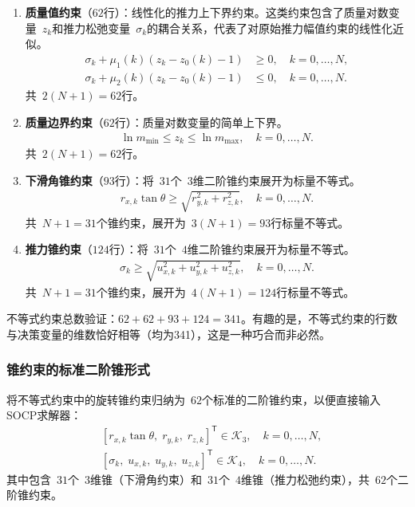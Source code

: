 \begin{enumerate}
  \item \textbf{质量值约束}（$62$行）：线性化的推力上下界约束。这类约束包含了质量对数变量~$z_k$和推力松弛变量~$\sigma_k$的耦合关系，代表了对原始推力幅值约束的线性化近似。
  \begin{align}
  \sigma_k + \mu_1(k)(z_k - z_0(k) - 1) &\ge 0,\quad k=0,\dots,N,\\
  \sigma_k + \mu_2(k)(z_k - z_0(k) - 1) &\le 0,\quad k=0,\dots,N.
  \end{align}
  共~$2(N+1)=62$行。

  \item \textbf{质量边界约束}（$62$行）：质量对数变量的简单上下界。
  \begin{align}
  \ln m_{\min} \le z_k \le \ln m_{\max},\quad k=0,\dots,N.
  \end{align}
  共~$2(N+1)=62$行。

  \item \textbf{下滑角锥约束}（$93$行）：将~$31$个~$3$维二阶锥约束展开为标量不等式。
  \begin{align}
  r_{x,k}\tan\theta \ge \sqrt{r_{y,k}^2 + r_{z,k}^2},\quad k=0,\dots,N.
  \end{align}
  共~$N+1=31$个锥约束，展开为~$3(N+1)=93$行标量不等式。

  \item \textbf{推力锥约束}（$124$行）：将~$31$个~$4$维二阶锥约束展开为标量不等式。
  \begin{align}
  \sigma_k \ge \sqrt{u_{x,k}^2 + u_{y,k}^2 + u_{z,k}^2},\quad k=0,\dots,N.
  \end{align}
  共~$N+1=31$个锥约束，展开为~$4(N+1)=124$行标量不等式。
\end{enumerate}

不等式约束总数验证：$62+62+93+124=341$。有趣的是，不等式约束的行数与决策变量的维数恰好相等（均为341），这是一种巧合而非必然。

\subsubsection{锥约束的标准二阶锥形式}

将不等式约束中的旋转锥约束归纳为~$62$个标准的二阶锥约束，以便直接输入SOCP求解器：
\begin{align}
&[r_{x,k}\tan\theta,\; r_{y,k},\; r_{z,k}]^{\mathsf T} \in \mathcal K_3,\quad k=0,\dots,N,\\
&[\sigma_k,\; u_{x,k},\; u_{y,k},\; u_{z,k}]^{\mathsf T} \in \mathcal K_4,\quad k=0,\dots,N.
\end{align}
其中包含~$31$个~$3$维锥（下滑角约束）和~$31$个~$4$维锥（推力松弛约束），共~$62$个二阶锥约束。

